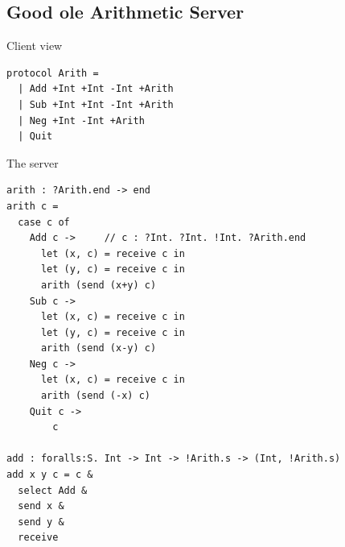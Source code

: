 \subsection{Good ole Arithmetic Server}
\label{sec:good-ole-arithmetic}

Client view
\begin{lstlisting}
protocol Arith =
  | Add +Int +Int -Int +Arith
  | Sub +Int +Int -Int +Arith
  | Neg +Int -Int +Arith
  | Quit
\end{lstlisting}
The server
\begin{lstlisting}
arith : ?Arith.end -> end
arith c =
  case c of
    Add c ->     // c : ?Int. ?Int. !Int. ?Arith.end
      let (x, c) = receive c in
      let (y, c) = receive c in
      arith (send (x+y) c)
    Sub c -> 
      let (x, c) = receive c in
      let (y, c) = receive c in
      arith (send (x-y) c)
    Neg c ->
      let (x, c) = receive c in
      arith (send (-x) c)
    Quit c ->
        c

add : foralls:S. Int -> Int -> !Arith.s -> (Int, !Arith.s)
add x y c = c &
  select Add & 
  send x &
  send y &
  receive
\end{lstlisting}

